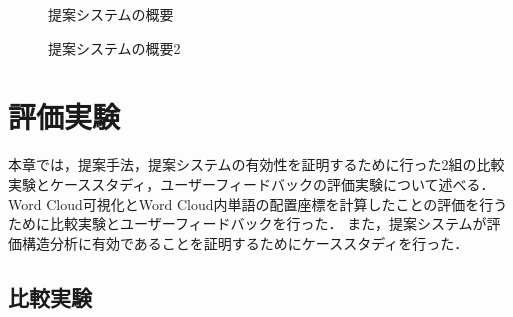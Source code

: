 \documentclass[syuuron]{kuee}
\begin{document}
		\begin{figure}
			\begin{center}
			\end{center}
			\caption{提案システムの概要}
	  		\label{fig:sys1}
		\end{figure}
		\begin{figure}
			\begin{center}
			\end{center}
			\caption{提案システムの概要2}
	  		\label{fig:sys2}
		\end{figure}

\chapter{評価実験}
	本章では，提案手法，提案システムの有効性を証明するために行った2組の比較実験とケーススタディ，ユーザーフィードバックの評価実験について述べる．
	Word Cloud可視化とWord Cloud内単語の配置座標を計算したことの評価を行うために比較実験とユーザーフィードバックを行った．
	また，提案システムが評価構造分析に有効であることを証明するためにケーススタディを行った．
	\section{比較実験}
\end{document}
